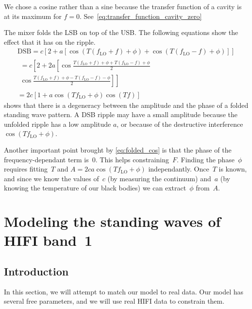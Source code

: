 We chose a cosine rather than a sine because the transfer function of a cavity is at its maximum for $f=0$.
See~\cref{eq:transfer_function_cavity_zero}

The mixer folds the LSB on top of the USB.
The following equations show the effect that it has on the ripple.
\begin{gather}
    \text{DSB} = c
        \left[
            2 + a 
            \left[
                \cos \left( T(f_\text{LO} + f) + \phi \right)
                +
                \cos \left( T(f_\text{LO} - f) + \phi \right)
            \right]
        \right]
    \\
    \begin{split}
    = c
        \left[
            2 + 2a
            \left[
                \cos \frac{T(f_\text{LO} + f) + \phi + T(f_\text{LO} - f) + \phi}{2}
            \right.
        \right.\\
        \left.
            \left.
                \cos \frac{T(f_\text{LO} + f) + \phi - T(f_\text{LO} - f) - \phi}{2}
            \right]
        \right]
    \end{split}
    \\
    = 2c \left[ 1+a \cos(T f_\text{LO} + \phi) \cos(T f) \right] \label{eq:folded_cos}
\end{gather}
 shows that there is a degeneracy between the amplitude and the phase of a folded standing wave pattern.
A DSB ripple may have a small amplitude because the unfolded ripple has a low amplitude $a$, or because of the destructive interference $\cos(T f_\text{LO} + \phi)$.

Another important point brought by \cref{eq:folded_cos} is that the phase of the frequency-dependant term is~0.
This helps constraining~$F$.
Finding the phase~$\phi$ requires fitting~$T$ and $A=2ca \cos(T f_\text{LO} + \phi)$
independantly.
Once~$T$ is known, and since we know the values of~$c$ (by measuring the continuum) and~$a$ (by knowing the temperature of our black bodies) we can extract~$\phi$ from~$A$.

\section{Modeling the standing waves of HIFI band~1}

\subsection{Introduction}
In this section, we will attempt to match our model to real data.
Our model has several free parameters, and we will use real HIFI data to constrain them.


